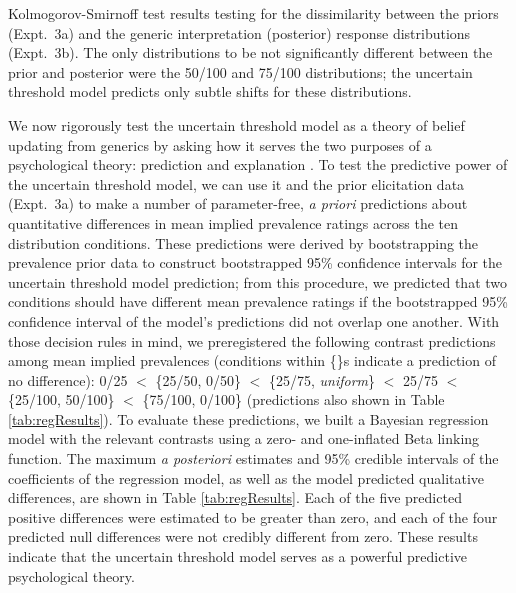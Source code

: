 \documentclass[floatsintext,doc]{apa6}
\begin{document}
\begin{center}
  \begin{table}[h]
    \centering

    \caption{Kolmogorov-Smirnoff test results testing for the dissimilarity between the priors (Expt.~3a) and the generic interpretation (posterior) response distributions (Expt.~3b). The only distributions to be not significantly different between the prior and posterior were the 50/100 and 75/100 distributions; the uncertain threshold model predicts only subtle shifts for these distributions.}
    \label{tab:ks}
  \end{table}
\end{center}


We now rigorously test the uncertain threshold model as a theory of belief updating from generics by asking how it serves the two purposes of a psychological theory: prediction and explanation \cite{shmueli2010explain, yarkoni2017choosing}. 
To test the predictive power of the uncertain threshold model, we can use it and the prior elicitation data (Expt.~3a) to make a number of parameter-free, \emph{a priori} predictions about quantitative differences in mean implied prevalence ratings across the ten distribution conditions.
These predictions were derived by bootstrapping the prevalence prior data to construct bootstrapped 95\% confidence intervals for the uncertain threshold model prediction; from this procedure, we predicted that two conditions should have different mean prevalence ratings if the bootstrapped 95\% confidence interval of the model's predictions did not overlap one another.
With those decision rules in mind, we preregistered the following contrast predictions among mean implied prevalences (conditions within \{\}s indicate a prediction of no difference): 0/25 \(<\) \{25/50, 0/50\} \(<\) \{25/75, \emph{uniform}\} \(<\) 25/75 \(<\) \{25/100, 50/100\} \(<\) \{75/100, 0/100\} (predictions also shown in Table \ref{tab:regResults}).
To evaluate these predictions, we built a Bayesian regression model with the relevant contrasts using a zero- and one-inflated Beta linking function.
The maximum \emph{a posteriori} estimates and 95\% credible intervals of the coefficients of the regression model, as well as the model predicted qualitative differences, are shown in Table \ref{tab:regResults}.
Each of the five predicted positive differences were estimated to be greater than zero, and each of the four predicted null differences were not credibly different from zero.
These results indicate that the uncertain threshold model serves as a powerful predictive psychological theory. 
\end{document}
